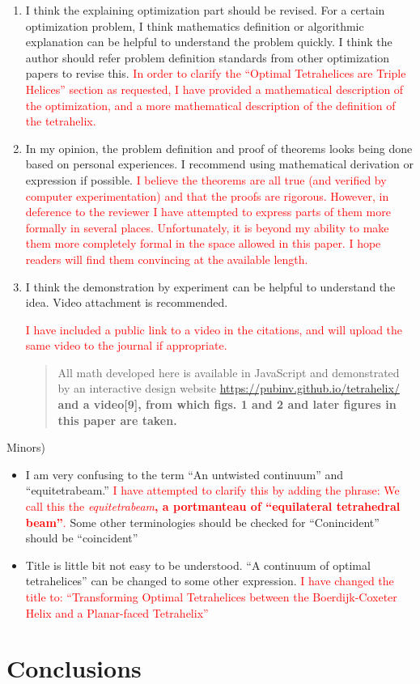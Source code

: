 \documentclass{article}
\newcommand{\highlighttext}[1] {\textcolor{red}{#1}}
\begin{document}
\begin{enumerate}
  \item
    I think the explaining optimization part should be revised. For a certain optimization problem, I think mathematics definition or algorithmic explanation can be helpful to understand the problem quickly. I think the author should refer problem definition standards from other optimization papers to revise this.
    \highlighttext{
      In order to clarify the ``Optimal Tetrahelices are Triple Helices'' section as requested,
      I have provided a mathematical description of the optimization, and a more mathematical
      description of the definition of the tetrahelix.
      }


  \item    
    In my opinion, the problem definition and proof of theorems looks being done based on personal experiences. I recommend using mathematical derivation or expression if possible.
    \highlighttext{
      I believe the theorems are all true (and verified by computer experimentation) and that the proofs
      are rigorous. However, in deference to the reviewer I have attempted to express parts of them
      more formally in several places. Unfortunately, it is beyond my ability to make them more completely formal
      in the space allowed in this paper. I hope readers will find them convincing at the available length.
      }

  \item    
    I think the demonstration by experiment can be helpful to understand the idea. Video attachment is recommended.
    \highlighttext{
I have included a public link to a video\cite{tetrahelixvideo} in the citations, and will upload the same video to the journal if appropriate.
\begin{quote}All math
developed here is available in JavaScript and demonstrated by an interactive
design website \url{https://pubinv.github.io/tetrahelix/}\cite{readtetrahelix}
\bf{and a video[9]},
from which figs. 1 and 2 and later figures in this paper 
are taken.      
\end{quote}
    }

\end{enumerate}

Minors)

\begin{itemize}
  \item
    I am very confusing to the term ``An untwisted continuum'' and ``equitetrabeam.''
    \highlighttext{I have attempted to clarify this by adding the phrase:
      We call this the \emph{equitetrabeam}\textbf{, a portmanteau of ``equilateral tetrahedral beam''}.}
    Some other terminologies should be checked for 
“Conincident” should be “coincident”
\item
  Title is little bit not easy to be understood. “A continuum of optimal tetrahelices” can be changed to some other expression.
  \highlighttext{
    I have changed the title to:
 ``Transforming Optimal Tetrahelices between the Boerdijk-Coxeter Helix and a Planar-faced Tetrahelix''
}
\end{itemize}


\section{Conclusions}\label{conclusions}



\end{document}
